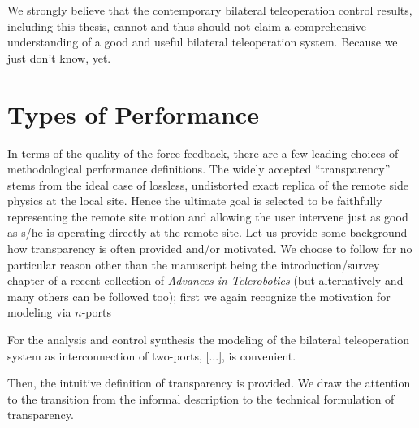 We strongly believe that the contemporary bilateral teleoperation control results, including this thesis, 
cannot and thus should not claim a comprehensive understanding of a good and useful bilateral teleoperation 
system. Because we just don't know, yet.

\section{Types of Performance}

In terms of the quality of the force-feedback, there are a few leading choices of methodological performance 
definitions. The widely accepted \enquote{transparency} stems from the ideal case of lossless, undistorted
exact replica of the remote side physics at the local site. Hence the ultimate goal is selected to be 
faithfully representing the remote site motion and allowing the user intervene just as good as s/he is operating 
directly at the remote site. Let us provide some background how transparency is often provided and/or motivated. We
choose to follow \cite{hirchebookchap} for no particular reason other than the manuscript being the introduction/survey 
chapter of a recent collection of \emph{Advances in Telerobotics} (but alternatively \cite{dudragne,yokokohjiyoshikawa,hannaford89} and many 
others can be followed too); first we again recognize the motivation for modeling via $n$-ports

\begin{displayquote}
For the analysis and control synthesis the modeling of the bilateral teleoperation system as interconnection of two-ports, [...], is 
convenient. 
\end{displayquote}
Then, the intuitive definition of transparency is provided. We draw the attention to the 
transition from the informal description to the technical formulation of transparency. 

